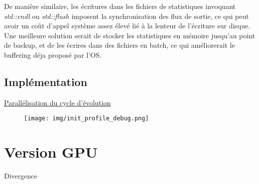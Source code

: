 \documentclass[a4paper, 10pt, twoside]{article}
\begin{document}
De manière similaire, les écritures dans les fichiers de statistiques invoquant \textit{std::endl} ou \textit{std::flush} imposent la synchronisation des flux de sortie, ce qui peut avoir un coût d'appel système assez élevé lié à la lenteur de l'écriture sur disque. Une meilleure solution serait de stocker les statistiques en mémoire jusqu'au point de backup, et de les écrires dans des fichiers en batch, ce qui améliorerait le buffering déja proposé par l'OS.

\subsection{Implémentation}
\hyperref[parallel/orga]{Parallélisation du cycle d'évolution}

\begin{figure}
	\texttt{[image: img/init\_profile\_debug.png]}
\end{figure}
\section{Version GPU}

Divergence \citep{nvidia/branching}





\end{document}
